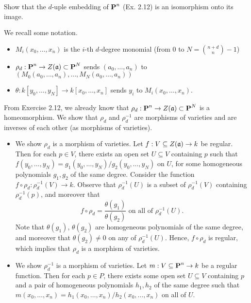 \documentclass[10pt]{amsart}
\begin{document}
\begin{exercise}[3.4]
    Show that the $d$-uple embedding of $\operatorname{\mathbf{P}}^n$ (Ex. 2.12) is an isomorphism 
    onto its image.
\end{exercise}

\begin{solution}
    \begin{luke}
        We recall some notation. 
        \begin{itemize}[itemsep=2pt, label={\textbullet}]
            \item $M_i(x_0, \dots, x_n)$ is the $i$-th $d$-degree monomial (from $0$ to $N = {n + d \choose n} -1 $) 
            \item $\rho_d: \operatorname{\mathbf{P}}^n \to Z(\mathfrak{a})\subset \operatorname{\mathbf{P}}^N$ sends $(a_0, \dots, a_n)$ to $(M_0(a_0, \dots, a_n), \dots, M_N(a_0, \dots, a_n))$ 
            \item $\theta: k[y_0, \dots, y_N] \to k[x_0, \dots, x_n]$ sends $y_i$ to $M_i(x_0, \dots, x_n)$.
        \end{itemize}
        From Exercise 2.12, we already know that $\rho_d: \operatorname{\mathbf{P}}^n \to Z(\mathfrak{a}) \subset \operatorname{\mathbf{P}}^N$ 
        is a homeomorphism. We show that $\rho_d$ and $\rho_d^{-1}$ are morphisms of varieties 
        and are inverses of each other (as morphisms of varieties).

        \begin{itemize}[itemsep=2pt, label={\textbullet}]
            \item We show $\rho_d$ is a morphism of varieties. 
            Let $f: V \subseteq Z(\mathfrak{a}) \to k$ be regular. Then for each $p \in V$, there exists 
            an open set $U \subseteq V$ containing $p$ such that $f(y_0, \dots, y_N) = g_1(y_0, \dots, y_N)/g_2(y_0, \dots, y_N)$
            on $U$, for some homogeneous polynomials $g_1, g_2$ of the same degree. 
            Consider the function $f \circ \rho_d: \rho_d^{-1}(V) \to k$. Observe that 
            $\rho_d^{-1}(U)$ is a subset of $\rho_d^{-1}(V)$ containing $\rho_d^{-1}(p)$, 
            and moreover that 
            \[
                f \circ \rho_d = \frac{\theta(g_1)}{\theta(g_2)} \text{ on all of } \rho_d^{-1}(U).
            \]
            Note that $\theta(g_1)$, $\theta(g_2)$ are homogeneous polynomials of the same degree, 
            and moreover that $\theta(g_2) \ne 0$ on any of $\rho_d^{-1}(U)$. 
            Hence, $f \circ \rho_d$ is regular, which implies that $\rho_d$ is a morphism of varieties. 
        
            \item We show $\rho_d^{-1}$ is a morphism of varieties. Let $m: V \subseteq \operatorname{\mathbf{P}}^n \to k$ be a
            regular function. Then for each $p \in P$, there exists some open set $U \subseteq V$ containing 
            $p$ and a pair of 
            homogeneous polynomials $h_1, h_2$ of the same degree such that 
            $m(x_0, \dots, x_n) = h_1(x_0, \dots, x_n)/h_2(x_0, \dots, x_n)$ on all of $U$. 
            

\end{itemize}
\end{luke}
\end{solution}
\end{document}
